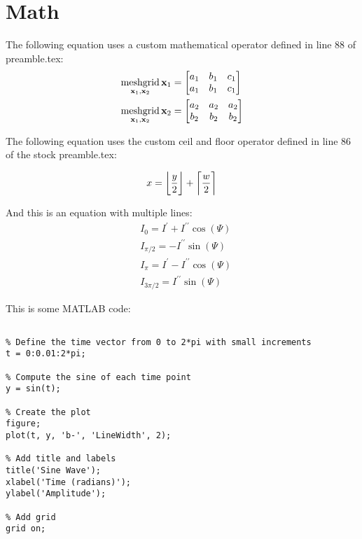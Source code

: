 \section{Math}

The following equation uses a custom mathematical operator defined in line 88
of preamble.tex:
\begin{equation}
\begin{aligned}
            \meshgrid_{\mathbf{x}_{1},\mathbf{x}_{2}}\mathbf{x}_{1}&=
            \begin{bmatrix}a_{1} & b_{1} & c_{1}\\
            a_{1} & b_{1} & c_{1}
\end{bmatrix}\\
            \meshgrid_{\mathbf{x}_{1},\mathbf{x}_{2}}\mathbf{x}_{2}&=
            \begin{bmatrix}a_{2} & a_{2} & a_{2}\\
            b_{2} & b_{2} & b_{2}
\end{bmatrix}
\end{aligned}
\end{equation}

The following equation uses the custom ceil and floor operator defined in line 86 of the stock preamble.tex:

\begin{equation}
x = \floor*{\frac{y}{2}} + \ceil*{\frac{w}{2}}
\end{equation}


And this is an equation with multiple lines:
\begin{equation}
\begin{aligned}
&I_{0}=I^{\prime}+I^{\prime\prime}\cos(\varPsi)   \\
&I_{\pi/2}=-I^{\prime\prime}\sin(\varPsi)                \\
&I_{\pi}=I^{\prime}-I^{\prime\prime}\cos(\varPsi)   \\
&I_{3\pi/2}=I^{\prime\prime}\sin(\varPsi)
\end{aligned}
\end{equation}

This is some MATLAB code:
\begin{lstlisting}[style=Matlab-editor]
% Sample MATLAB Code: Plotting a Sine Wave

% Define the time vector from 0 to 2*pi with small increments
t = 0:0.01:2*pi;

% Compute the sine of each time point
y = sin(t);

% Create the plot
figure;
plot(t, y, 'b-', 'LineWidth', 2);

% Add title and labels
title('Sine Wave');
xlabel('Time (radians)');
ylabel('Amplitude');

% Add grid
grid on;
\end{lstlisting}

